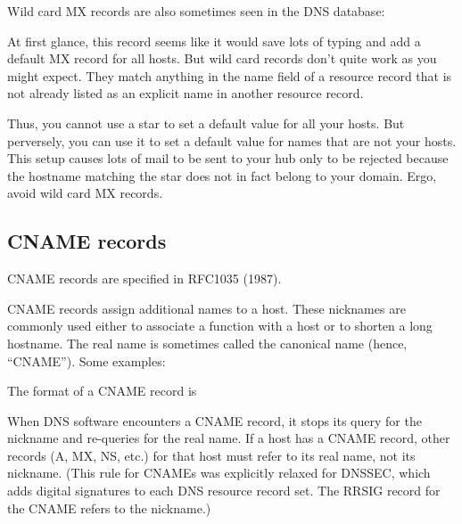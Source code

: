 \protect\hypertarget{part0024_split_027.htmlux5cux23_idTextAnchor883}{}{}Wild
card MX records are also sometimes seen in the DNS database:


At first glance, this record seems like it would save lots of typing and
add a default MX record for all hosts. But wild card records don't quite
work as you might expect. They match anything in the {name} field of a
resource record that is {not} already listed as an explicit name in
another resource record.

Thus, you {cannot} use a star to set a default value for all your hosts.
But perversely, you can use it to set a default value for names that are
not your hosts. This setup causes lots of mail to be sent to your hub
only to be rejected because the hostname matching the star does not in
fact belong to your domain. Ergo, avoid wild card MX records.

\protect\hypertarget{part0024_split_028.html}{}{}

\hypertarget{part0024_split_028.htmlux5cux23_idContainer1069}{}
\hypertarget{part0024_split_028.htmlux5cux23calibre_pb_27}{%
\subsection[CNAME
records]{\texorpdfstring{\protect\hypertarget{part0024_split_028.htmlux5cux23_idTextAnchor884}{}{}\protect\hypertarget{part0024_split_028.htmlux5cux23_idIndexMarker2096}{}{}\protect\hypertarget{part0024_split_028.htmlux5cux23_idIndexMarker2097}{}{}\protect\hypertarget{part0024_split_028.htmlux5cux23_idTextAnchor885}{}{}CNAME
records}{CNAME records}}\label{part0024_split_028.htmlux5cux23calibre_pb_27}}

\leavevmode\hypertarget{part0024_split_028.htmlux5cux23_idContainer957}{}%
CNAME records are specified in RFC1035 (1987).

\protect\hypertarget{part0024_split_028.htmlux5cux23_idIndexMarker2098}{}{}CNAME
records assign additional names to a host. These nicknames are commonly
used either to associate a function with a host or to shorten a long
hostname. The real name is sometimes called the canonical name (hence,
``CNAME''). Some examples:


The format of a CNAME record is


When DNS software encounters a CNAME record, it stops its query for the
nickname and re-queries for the real name. If a host has a CNAME record,
other records (A, MX, NS, etc.) for that host must refer to its real
name, not its nickname. (This rule for CNAMEs was explicitly relaxed for
DNSSEC, which adds digital signatures to each DNS resource record set.
The RRSIG record for the CNAME refers to the nickname.)

